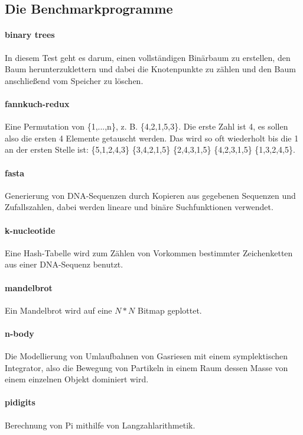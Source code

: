\subsection{Die Benchmarkprogramme}

\paragraph{binary trees}

In diesem Test geht es darum, einen vollständigen Binärbaum zu erstellen, den Baum \glqq herunterzuklettern\grqq{} und dabei die Knotenpunkte zu zählen und den Baum anschließend vom Speicher zu löschen.

\paragraph{fannkuch-redux} Eine Permutation von \{1,...,n\}, z. B. \{4,2,1,5,3\}. Die erste Zahl ist 4, es sollen also die ersten 4 Elemente getauscht werden. Das wird so oft wiederholt bis die 1 an der ersten Stelle ist: \{5,1,2,4,3\} \{3,4,2,1,5\} \{2,4,3,1,5\} \{4,2,3,1,5\} \{1,3,2,4,5\}.

\paragraph{fasta} Generierung von DNA-Sequenzen durch Kopieren aus gegebenen Sequenzen und Zufallszahlen, dabei werden lineare und binäre Suchfunktionen verwendet.

\paragraph{k-nucleotide} Eine Hash-Tabelle wird zum Zählen von Vorkommen bestimmter Zeichenketten aus einer DNA-Sequenz benutzt.

\paragraph{mandelbrot} Ein Mandelbrot wird auf eine $N*N$ Bitmap geplottet.

\paragraph{n-body} Die Modellierung von Umlaufbahnen von Gasriesen mit einem symplektischen Integrator, also die Bewegung von Partikeln in einem Raum dessen Masse von einem einzelnen Objekt dominiert wird.

\paragraph{pidigits} Berechnung von Pi mithilfe von Langzahlarithmetik.

